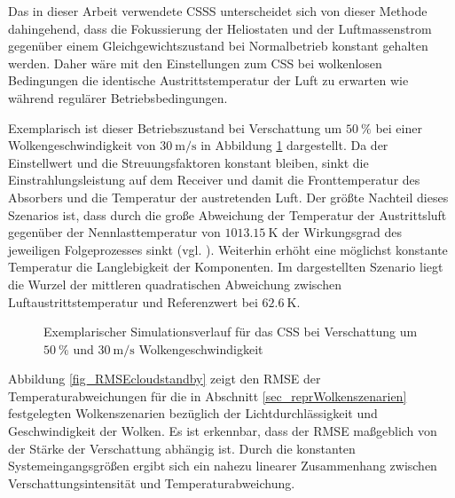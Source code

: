 Das in dieser Arbeit verwendete CSSS unterscheidet sich von dieser Methode dahingehend, dass die Fokussierung der Heliostaten und der Luftmassenstrom gegenüber einem Gleichgewichtszustand bei Normalbetrieb konstant gehalten werden.
Daher wäre mit den Einstellungen zum CSS bei wolkenlosen Bedingungen die identische Austrittstemperatur der Luft zu erwarten wie während regulärer Betriebsbedingungen.

Exemplarisch ist dieser Betriebszustand bei Verschattung um $\SI{50}{\percent}$ bei einer Wolkengeschwindigkeit von $\SI{30}{\metre\per\second}$ in Abbildung \ref{fig_cloudstandby5030} dargestellt.
Da der Einstellwert und die Streuungsfaktoren konstant bleiben, sinkt die Einstrahlungsleistung auf dem Receiver und damit die Fronttemperatur des Absorbers und die Temperatur der austretenden Luft.
Der größte Nachteil dieses Szenarios ist, dass durch die große Abweichung der Temperatur der Austrittsluft gegenüber der Nennlasttemperatur von $\SI{1013.15}{\kelvin}$ \cite[S.29]{HandbuchJülich} der Wirkungsgrad des jeweiligen Folgeprozesses sinkt (vgl. \cite[S.15ff]{DissGall}).
Weiterhin erhöht eine möglichst konstante Temperatur die Langlebigkeit der Komponenten.
Im dargestellten Szenario liegt die Wurzel der mittleren quadratischen Abweichung zwischen Luftaustrittstemperatur und Referenzwert bei $\SI{62.6}{\kelvin}$.

\begin{figure}[h!]
    \centering
    \setlength{\fboxsep}{1pt}
    \setlength{\fboxrule}{1pt}
\caption[Exemplarischer Simulationsverlauf für das CSS bei Verschattung um $\SI{50}{\percent}$ und $\SI{30}{\metre\per\second}$ Wolkengeschwindigkeit]{Exemplarischer Simulationsverlauf für das CSS bei Verschattung um $\SI{50}{\percent}$ und $\SI{30}{\metre\per\second}$ Wolkengeschwindigkeit}
    \label{fig_cloudstandby5030}
\end{figure}

Abbildung \ref{fig_RMSEcloudstandby} zeigt den RMSE der Temperaturabweichungen für die in Abschnitt \ref{sec_reprWolkenszenarien} festgelegten Wolkenszenarien bezüglich der Lichtdurchlässigkeit und Geschwindigkeit der Wolken.
Es ist erkennbar, dass der RMSE maßgeblich von der Stärke der Verschattung abhängig ist.
Durch die konstanten Systemeingangsgrößen ergibt sich ein nahezu linearer Zusammenhang zwischen Verschattungsintensität und Temperaturabweichung.

